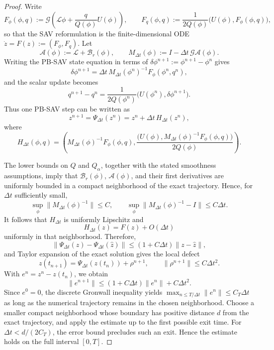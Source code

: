 \documentclass[10pt,a4paper]{amsart}
\begin{document}
\begin{proof}
Write
\[
F_\phi(\phi,q)
:=
\mathcal G\left(\mathcal L\phi+\frac{q}{Q(\phi)}U(\phi)\right),
\qquad
F_q(\phi,q)
:=
\frac{1}{2Q(\phi)}\bigl(U(\phi),F_\phi(\phi,q)\bigr),
\]
so that the SAV reformulation is the finite-dimensional ODE
\(\dot z=F(z):=(F_\phi,F_q)\). Let
\[
\mathcal A(\phi):=\mathcal L+\mathcal B_r(\phi),
\qquad
M_{\Delta t}(\phi):=I-\Delta t\,\mathcal G\mathcal A(\phi).
\]
Writing the PB-SAV state equation in terms of
\(\delta\phi^{n+1}:=\phi^{n+1}-\phi^n\) gives
\[
\delta\phi^{n+1}
=
\Delta t\,M_{\Delta t}(\phi^n)^{-1}F_\phi(\phi^n,q^n),
\]
and the scalar update becomes
\[
q^{n+1}-q^n
=
\frac{1}{2Q(\phi^n)}
\bigl(U(\phi^n),\delta\phi^{n+1}\bigr).
\]
Thus one PB-SAV step can be written as
\[
z^{n+1}=\Psi_{\Delta t}(z^n)
=z^n+\Delta t\,H_{\Delta t}(z^n),
\]
where
\[
H_{\Delta t}(\phi,q)
=
\left(
M_{\Delta t}(\phi)^{-1}F_\phi(\phi,q),
\frac{\bigl(U(\phi),M_{\Delta t}(\phi)^{-1}F_\phi(\phi,q)\bigr)}
{2Q(\phi)}
\right).
\]

The lower bounds on \(Q\) and \(Q_\alpha\), together with the stated
smoothness assumptions, imply that \(\mathcal B_r(\phi)\),
\(\mathcal A(\phi)\), and their first derivatives are uniformly bounded in
a compact neighborhood of the exact trajectory. Hence, for
\(\Delta t\) sufficiently small,
\[
\sup_\phi\|M_{\Delta t}(\phi)^{-1}\|\le C,
\qquad
\sup_\phi\|M_{\Delta t}(\phi)^{-1}-I\|\le C\Delta t.
\]
It follows that \(H_{\Delta t}\) is uniformly Lipschitz and
\[
H_{\Delta t}(z)=F(z)+O(\Delta t)
\]
uniformly in that neighborhood. Therefore,
\[
\|\Psi_{\Delta t}(z)-\Psi_{\Delta t}(\widehat z)\|
\le (1+C\Delta t)\|z-\widehat z\|,
\]
and Taylor expansion of the exact solution gives the local defect
\[
z(t_{n+1})
=
\Psi_{\Delta t}(z(t_n))+\rho^{n+1},
\qquad
\|\rho^{n+1}\|\le C\Delta t^2.
\]
With \(e^n=z^n-z(t_n)\), we obtain
\[
\|e^{n+1}\|
\le (1+C\Delta t)\|e^n\|+C\Delta t^2.
\]
Since \(e^0=0\), the discrete Gronwall inequality yields
\(\max_{n\le T/\Delta t}\|e^n\|\le C_T\Delta t\) as long as the numerical
trajectory remains in the chosen neighborhood. Choose a smaller compact
neighborhood whose boundary has positive distance \(d\) from the exact
trajectory, and apply the estimate up to the first possible exit time.
For \(\Delta t<d/(2C_T)\), the error bound precludes such an exit. Hence
the estimate holds on the full interval \([0,T]\).
\end{proof}
\end{document}
